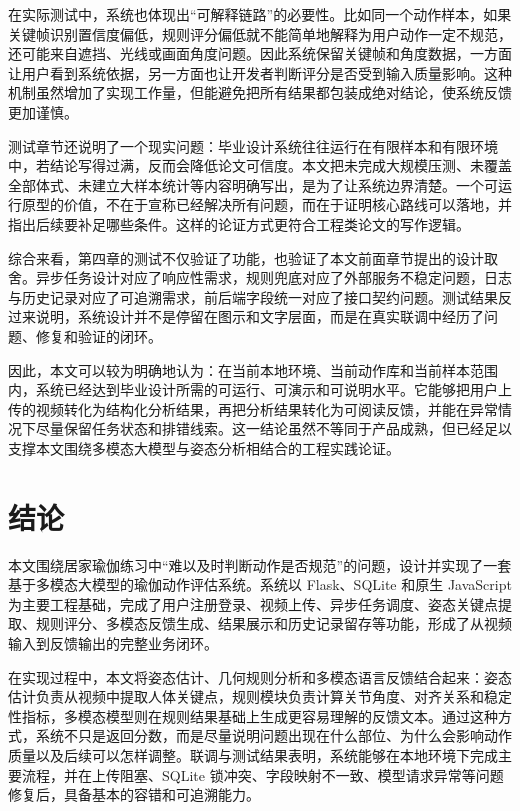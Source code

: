 \documentclass[UTF8,twoside]{ctexrep}
\makeatletter
\def@NAT@last@yr{\@citea}%
\def@NAT@last@yr{-\NAT@penalty}%
\makeatother
\begin{document}
在实际测试中，系统也体现出“可解释链路”的必要性。比如同一个动作样本，如果关键帧识别置信度偏低，规则评分偏低就不能简单地解释为用户动作一定不规范，还可能来自遮挡、光线或画面角度问题。因此系统保留关键帧和角度数据，一方面让用户看到系统依据，另一方面也让开发者判断评分是否受到输入质量影响。这种机制虽然增加了实现工作量，但能避免把所有结果都包装成绝对结论，使系统反馈更加谨慎。

测试章节还说明了一个现实问题：毕业设计系统往往运行在有限样本和有限环境中，若结论写得过满，反而会降低论文可信度。本文把未完成大规模压测、未覆盖全部体式、未建立大样本统计等内容明确写出，是为了让系统边界清楚。一个可运行原型的价值，不在于宣称已经解决所有问题，而在于证明核心路线可以落地，并指出后续要补足哪些条件。这样的论证方式更符合工程类论文的写作逻辑。

综合来看，第四章的测试不仅验证了功能，也验证了本文前面章节提出的设计取舍。异步任务设计对应了响应性需求，规则兜底对应了外部服务不稳定问题，日志与历史记录对应了可追溯需求，前后端字段统一对应了接口契约问题。测试结果反过来说明，系统设计并不是停留在图示和文字层面，而是在真实联调中经历了问题、修复和验证的闭环。

因此，本文可以较为明确地认为：在当前本地环境、当前动作库和当前样本范围内，系统已经达到毕业设计所需的可运行、可演示和可说明水平。它能够把用户上传的视频转化为结构化分析结果，再把分析结果转化为可阅读反馈，并能在异常情况下尽量保留任务状态和排错线索。这一结论虽然不等同于产品成熟，但已经足以支撑本文围绕多模态大模型与姿态分析相结合的工程实践论证。

\fi

\chapter*{结论}

本文围绕居家瑜伽练习中“难以及时判断动作是否规范”的问题，设计并实现了一套基于多模态大模型的瑜伽动作评估系统。系统以 Flask、SQLite 和原生 JavaScript 为主要工程基础，完成了用户注册登录、视频上传、异步任务调度、姿态关键点提取、规则评分、多模态反馈生成、结果展示和历史记录留存等功能，形成了从视频输入到反馈输出的完整业务闭环。

在实现过程中，本文将姿态估计、几何规则分析和多模态语言反馈结合起来：姿态估计负责从视频中提取人体关键点，规则模块负责计算关节角度、对齐关系和稳定性指标，多模态模型则在规则结果基础上生成更容易理解的反馈文本。通过这种方式，系统不只是返回分数，而是尽量说明问题出现在什么部位、为什么会影响动作质量以及后续可以怎样调整。联调与测试结果表明，系统能够在本地环境下完成主要流程，并在上传阻塞、SQLite 锁冲突、字段映射不一致、模型请求异常等问题修复后，具备基本的容错和可追溯能力。
\end{document}
